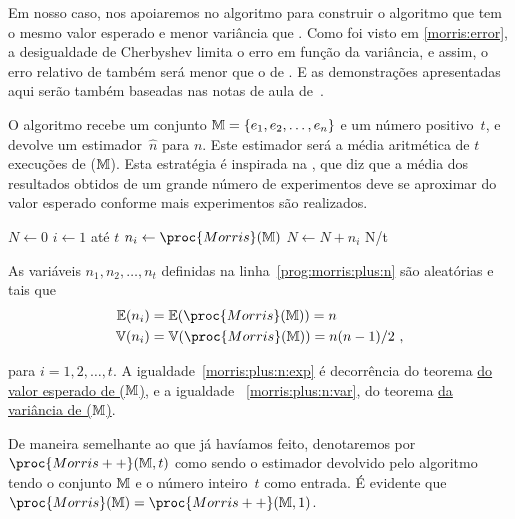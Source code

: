 Em nosso caso, nos apoiaremos no algoritmo  para construir o algoritmo  que tem o mesmo 
valor esperado e menor variância que . Como foi visto em \eqref{morris:error}, a desigualdade de Cherbyshev
limita o erro em função da variância, e assim, o erro relativo de  também será menor que o de 
. E as demonstrações apresentadas aqui serão também baseadas nas notas de aula 
de~\citep{LectureNotesAndoni}.

O algoritmo  recebe um conjunto $\mathbb{M} = \{ e_1, e_2, \dots, e_n \}$ e um número positivo~$t$, e devolve 
um estimador~$\hat{n}$ para $n$. Este estimador será a média aritmética de $t$ execuções de ($\mathbb{M}$). Esta 
estratégia é inspirada na , que diz que a média dos resultados obtidos de um grande número 
de experimentos deve se aproximar do valor esperado conforme mais experimentos são realizados.

\begin{codebox}
  \li $N \gets 0$                       \label{prog:morris:plus:start}                
  \li \For $i \gets 1$ até $t$                             
  \li \Do
      $n_i \gets \proc{Morris}(\Mbb)$   \label{prog:morris:plus:n}
  \li $N \gets N + n_i$
      \End
  \li
  \Return N/t
  \End
\end{codebox}

As variáveis $n_1, n_2, \dots, n_t$ definidas na linha~\ref{prog:morris:plus:n} são aleatórias e tais que
\begin{align}
  \Ebb(n_i) &= \Ebb(\proc{Morris}(\Mbb)) = n                \label{morris:plus:n:exp} \\     
  \Vbb(n_i) &= \Vbb(\proc{Morris}(\Mbb)) = n(n - 1)/2 \ ,   \label{morris:plus:n:var}
\end{align}

para $i = 1, 2, \dots, t$. A igualdade~\eqref{morris:plus:n:exp} é decorrência do teorema 
\hyperref[morris:theorem:expected_value]{do valor esperado de ($\mathbb{M}$)}, e a igualdade~
\eqref{morris:plus:n:var}, do teorema \hyperref[morris:theorem:variance]{da variância de ($\mathbb{M}$)}.

De maneira semelhante ao que já havíamos feito, denotaremos por $\proc{Morris++}(\Mbb, t)$ como sendo o estimador 
devolvido pelo algoritmo tendo o conjunto $\mathbb{M}$ e o número inteiro~$t$ como entrada. É evidente que 
$\proc{Morris}(\Mbb) = \proc{Morris++}(\Mbb, 1)$.

